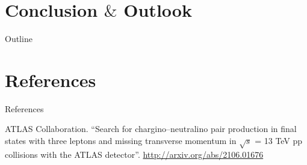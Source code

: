 \documentclass[UKenglish]{beamer}
\begin{document}
\section{Conclusion $\&$ Outlook}
\begin{frame}{Outline}
    \tableofcontents[currentsection]
\end{frame}




\section{References}


\begin{frame}[allowframebreaks]{References}
    \begin{thebibliography}{}

        ATLAS Collaboration.
        \newblock \enquote{Search for chargino--neutralino pair production in final states with three leptons and missing transverse momentum in {$\sqrt{s}$} = 13 {TeV} pp collisions with the {ATLAS} detector}.
        \newblock \url{http://arxiv.org/abs/2106.01676}


    \end{thebibliography}
\end{frame}
\end{document}
